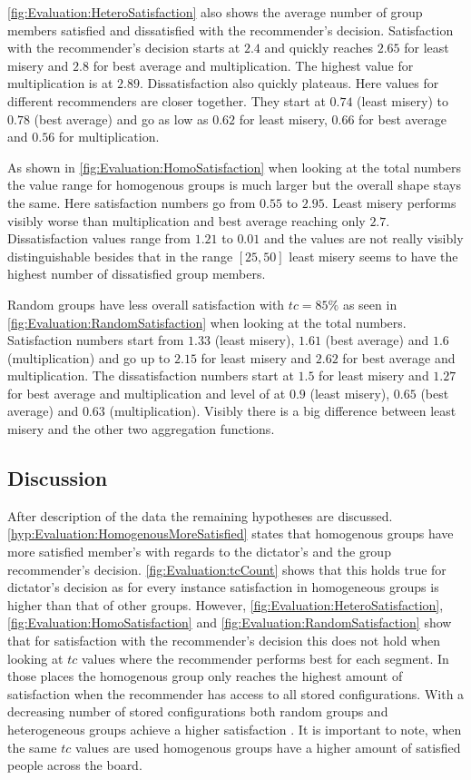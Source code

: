 \autoref{fig:Evaluation:HeteroSatisfaction} also shows the average number of group members satisfied and dissatisfied with the recommender's decision. Satisfaction with the recommender's decision starts at $2.4$ and quickly reaches $2.65$ for least misery and $2.8$ for best average and multiplication. The highest value for multiplication is at $2.89$. Dissatisfaction also  quickly plateaus. Here values for different recommenders are closer together. They start at $0.74$ (least misery) to $0.78$ (best average) and go as low as $0.62$ for least misery, $0.66$ for best average and $0.56$ for multiplication.

As shown in \autoref{fig:Evaluation:HomoSatisfaction} when looking at the total numbers the value range for homogenous groups is much larger but the overall shape stays the same. Here satisfaction numbers go from $0.55$ to $2.95$. Least misery performs visibly worse than multiplication and best average reaching only $2.7$. Dissatisfaction values range from $1.21$ to $0.01$ and the values are not really visibly distinguishable besides that in the range $[25,50]$ least misery seems to have the highest number of dissatisfied group members.

Random groups have less overall satisfaction with $tc = 85\%$ as seen in \autoref{fig:Evaluation:RandomSatisfaction} when looking at the total numbers. Satisfaction numbers start from $1.33$ (least misery), $1.61$ (best average) and $1.6$ (multiplication) and go up to $2.15$ for least misery and $2.62$ for best average and multiplication. The dissatisfaction numbers start at $1.5$ for least misery and $1.27$ for best average and multiplication and level of at $0.9$ (least misery), $0.65$ (best average) and $0.63$ (multiplication). Visibly there is a big difference between least misery and the other two aggregation functions.

\subsection{Discussion}

After description of the data the remaining hypotheses are discussed.
\autoref{hyp:Evaluation:HomogenousMoreSatisfied} states that homogenous groups have more satisfied member's with regards to the dictator's and the group recommender's decision. \autoref{fig:Evaluation:tcCount} shows that this holds true for dictator's decision as for every instance satisfaction in homogeneous groups is higher than that of other groups. However, \autoref{fig:Evaluation:HeteroSatisfaction}, \autoref{fig:Evaluation:HomoSatisfaction} and \autoref{fig:Evaluation:RandomSatisfaction} show that for satisfaction with the recommender's decision this does not hold when looking at $tc$ values where the recommender performs best for each  segment. In those places the homogenous group only reaches the highest amount of satisfaction when the recommender has access to all stored configurations. With a decreasing number of stored configurations both random groups and heterogeneous groups achieve a higher satisfaction . It is important to note, when the same $tc$ values are used homogenous groups have a higher amount of satisfied people across the board.

